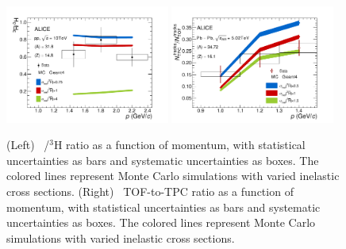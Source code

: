 \begin{figure}
    \centering
    \includegraphics[width=0.48\textwidth]{figures/Anti-triton-to-triton_Ratio.pdf}%
    \includegraphics[width=0.48\textwidth]{figures/Anti-triton-TPC-TOF_Ratio.pdf}%
    \caption{(Left) \atrit\ /$^3\mathrm{H}$ ratio as a function of momentum, with statistical uncertainties as bars and systematic uncertainties as boxes. The colored lines represent Monte Carlo simulations with varied inelastic cross sections. (Right) \atrit\ TOF-to-TPC ratio as a function of momentum, with statistical uncertainties as bars and systematic uncertainties as boxes. The colored lines represent Monte Carlo simulations with varied inelastic cross sections. }
    \label{fig:Results:tbar:ratios}
\end{figure}

